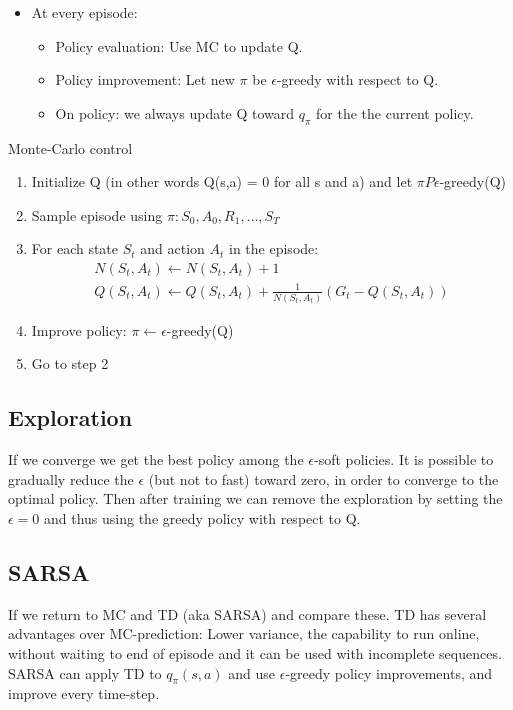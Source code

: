 \begin{itemize}
	\item At every episode:
	\begin{itemize}
		\item Policy evaluation: Use MC to update Q.
		\item Policy improvement: Let new $\pi$ be $\epsilon$-greedy with respect to Q.
		\item On policy: we always update Q toward $q_\pi$ for the the current policy.
	\end{itemize}
\end{itemize}

\begin{wbox}{Monte-Carlo control}
	\begin{enumerate}
		\item Initialize Q (in other words Q(s,a) = 0 for all s and a) and let $\pi P \epsilon$-greedy(Q)
		\item Sample episode using $\pi: S_0,A_0,R_1,\ldots,S_T$
		\item For each state $S_t$ and action $A_t$ in the episode:
			\begin{equation}
			\begin{aligned}
				N(S_t,A_t) \leftarrow N(S_t,A_t)+1 \\
				Q(S_t,A_t) \leftarrow Q(S_t,A_t) + \frac{1} {N(S_t,A_t)}(G_t - Q(S_t,A_t)) 
			\end{aligned}
			\end{equation}
		\item Improve policy: $\pi \leftarrow \epsilon$-greedy(Q)
		\item Go to step 2 
	\end{enumerate}
\end{wbox}

\subsection{Exploration}
If we converge we get the best policy among the $\epsilon$-soft policies. It is possible to gradually reduce the $\epsilon$ (but not to fast) toward zero, in order to converge to the optimal policy. Then after training we can remove the exploration by setting the $\epsilon = 0$ and thus using the greedy policy with respect to Q. 

\subsection{SARSA}
If we return to MC and TD (aka SARSA) and compare these. TD has several advantages over MC-prediction: Lower variance, the capability to run online, without waiting to end of episode and it can be used with incomplete sequences. SARSA can apply TD to $q_\pi(s,a)$ and use $\epsilon$-greedy policy improvements, and improve every time-step. 

